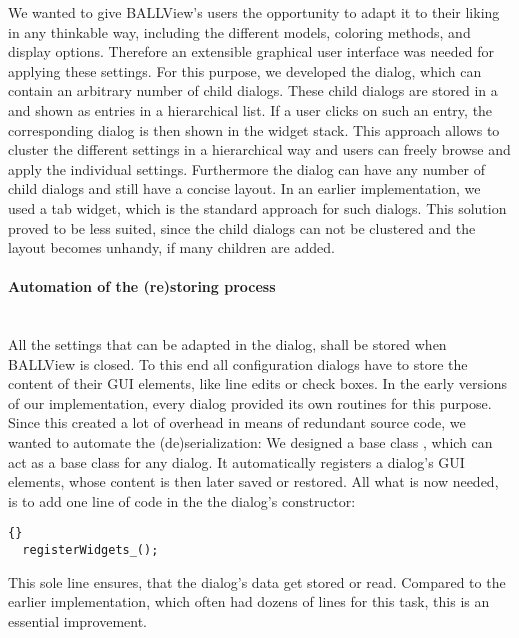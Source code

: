 We wanted to give BALLView's users the opportunity to adapt it to their liking 
in any thinkable way, including the different models, coloring methods, and 
display options. Therefore an extensible graphical user interface was needed 
for applying these settings. For this purpose, we developed the 
 dialog, which can contain an arbitrary number of child 
dialogs. These child dialogs are stored in a  and shown 
as entries in a hierarchical list. If a user clicks on such an entry, the 
corresponding dialog is then shown in the widget stack. This approach allows 
to cluster the different settings in a hierarchical way and users can freely 
browse and apply the individual settings. Furthermore the  
dialog can have any number of child dialogs and still have a concise layout.
In an earlier implementation, we used a tab widget, which is the standard 
approach for such dialogs. This solution proved to be less suited, since the 
child dialogs can not be clustered and the layout becomes unhandy, if many 
children are added.

\paragraph{Automation of the (re)storing process}
\hspace*{\fill}\\
All the settings that can be adapted in the  dialog, shall 
be stored when \mbox{BALLView} is closed. To this end all configuration 
dialogs have to store the content of their GUI elements, like line edits or 
check boxes. In the early versions of our implementation, every dialog 
provided its own routines for this purpose. Since this created a lot of 
overhead in means of redundant source code, we wanted to automate the 
(de)serialization: We designed a base class , which 
can act as a base class for any dialog. It automatically registers a dialog's 
GUI elements, whose content is then later saved or restored. All what is now 
needed, is to add one line of code in the the dialog's constructor:

\begin{lstlisting}{}
  registerWidgets_();
\end{lstlisting}

\noindent
This sole line ensures, that the dialog's data get stored or read. Compared to
the earlier implementation, which often had dozens of lines for this task, 
this is an essential improvement.

